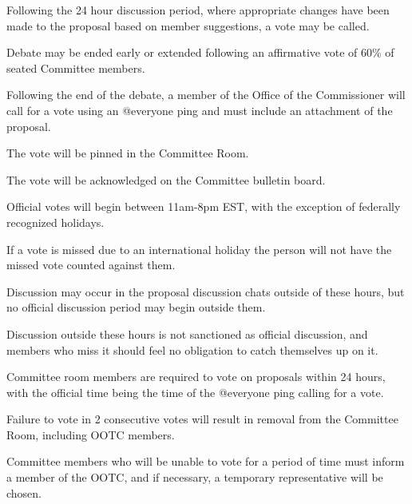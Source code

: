 \begin{deepEnumerate}
    \item Following the 24 hour discussion period, where appropriate changes have been made to the proposal based on member suggestions, a vote may be called.
    \item Debate may be ended early or extended following an affirmative vote of 60\% of seated Committee members.
    \item Following the end of the debate, a member of the Office of the Commissioner will call for a vote using an @everyone ping and must include an attachment of the proposal.
    \begin{deepEnumerate}
        \item The vote will be pinned in the Committee Room.
        \item The vote will be acknowledged on the Committee bulletin board.
    \end{deepEnumerate}
    \item Official votes will begin between 11am-8pm EST, with the exception of federally recognized holidays.
    \begin{deepEnumerate}
        \item If a vote is missed due to an international holiday the person will not have the missed vote counted against them.
        \item Discussion may occur in the proposal discussion chats outside of these hours, but no official discussion period may begin outside them.
        \item Discussion outside these hours is not sanctioned as official discussion, and members who miss it should feel no obligation to catch themselves up on it.
    \end{deepEnumerate}
    \item Committee room members are required to vote on proposals within 24 hours, with the official time being the time of the @everyone ping calling for a vote.
    \begin{deepEnumerate}
        \item Failure to vote in 2 consecutive votes will result in removal from the Committee Room, including OOTC members.
        \begin{deepEnumerate}
            \item Committee members who will be unable to vote for a period of time must inform a member of the OOTC, and if necessary, a temporary representative will be chosen.

\end{deepEnumerate}
\end{deepEnumerate}
\end{deepEnumerate}
